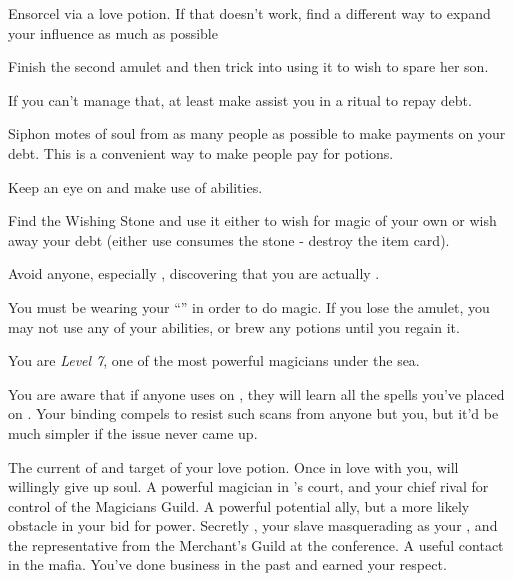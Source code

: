 \documentclass[char]{NeptuneBall}
\begin{document}
\begin{itemz}[Goals]
  \item Ensorcel \cKing{\King} \cKing{} via a love potion. If that doesn't work, find a different way to expand your influence as much as possible
  \item Finish the second amulet and then trick \cAriel{} into using it to wish to spare her son.
  \item If you can't manage that, at least make \cAriel{} assist you in a \gRitual{} ritual to repay \cAriel{\their} debt.
  \item Siphon motes of soul from as many people as possible to make payments on your debt. This is a convenient way to make people pay for potions.
  \item Keep an eye on \cSlave{} and make use of \cSlave{\their} abilities.
	\item Find the Wishing Stone and use it either to wish for magic of your own or wish away your debt (either use consumes the stone - destroy the item card).
  \item Avoid anyone, especially \cKing{}, discovering that you are actually \cWitch{}.
\end{itemz}

\begin{itemz}[Notes]
  \item You must be wearing your ``\iAmulet{}'' in order to do magic. If you lose the amulet, you may not use any of your abilities, or brew any potions until you regain it.
	\item You are \emph{Level 7}, one of the most powerful magicians under the sea.
	\item You are aware that if anyone uses \aPerceive{} on \cSlave{}, they will learn all the spells you've placed on \cSlave{\them}.  Your binding compels \cSlave{} to resist such scans from anyone but you, but it'd be much simpler if the issue never came up.
\end{itemz}

\begin{contacts}
  \contact{\cKing{}} The current \cKing{\King} of \pAtlantis{} and target of your love potion. Once \cKing{\they} \cKing{\are} in love with you, \cKing{\they} will willingly give up \cKing{\their} soul.
  \contact{\cManta{}} A powerful magician in \cKing{}'s court, and your chief rival for control of the Magicians Guild. A powerful potential ally, but a more likely obstacle in your bid for power.
  \contact{\cSlave{\MYname}} Secretly \cSlave{\Prince} \cSlave{}, your slave masquerading as your \cSlave{\sibling}, and the representative from the Merchant's Guild at the conference.
  \contact{\cPriest{}} A useful contact in the mafia. You've done business in the past and \cPriest{\they} \cPriest{\have} earned your respect.
\end{contacts}
\end{document}
